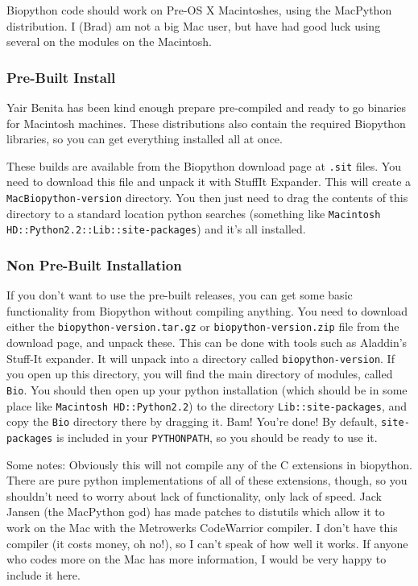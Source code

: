 \documentclass{article}
\begin{document}
Biopython code should work on Pre-OS X Macintoshes, using the MacPython distribution. I (Brad) am not a big Mac user, but have had good luck using several on the modules on the Macintosh.

\subsubsection{Pre-Built Install}

Yair Benita has been kind enough prepare pre-compiled and ready to go
binaries for Macintosh machines. These distributions also contain the
required Biopython libraries, so you can get everything installed all at
once. 


These builds are available from the Biopython download page at
\verb|.sit| files. You need to download this file and unpack it with
StuffIt Expander. This will create a \verb|MacBiopython-version|
directory. You then just need to drag the contents of this directory to
a standard location python searches (something like 
\verb|Macintosh HD::Python2.2::Lib::site-packages|) and it's all installed.

\subsubsection{Non Pre-Built Installation}

If you don't want to use the pre-built releases, you can get some basic
functionality from Biopython without compiling anything.
You need to download either the \verb|biopython-version.tar.gz| or \verb|biopython-version.zip| file from the download page, and unpack these. This can be done with tools such as Aladdin's Stuff-It expander. It will unpack into a directory called \verb|biopython-version|. If you open up this directory, you will find the main directory of modules, called \verb|Bio|. You should then open up your python installation (which should be in some place like \verb|Macintosh HD::Python2.2|) to the directory \verb|Lib::site-packages|, and copy the \verb|Bio| directory there by dragging it. Bam! You're done! By default, \verb|site-packages| is included in your \verb|PYTHONPATH|, so you should be ready to use it.


Some notes: Obviously this will not compile any of the C extensions in biopython. There are pure python implementations of all of these extensions, though, so you shouldn't need to worry about lack of functionality, only lack of speed. Jack Jansen (the MacPython god) has made patches to distutils which allow it to work on the Mac with the Metrowerks CodeWarrior compiler. I don't have this compiler (it costs money, oh no!), so I can't speak of how well it works. If anyone who codes more on the Mac has more information, I would be very happy to include it here.
\end{document}
